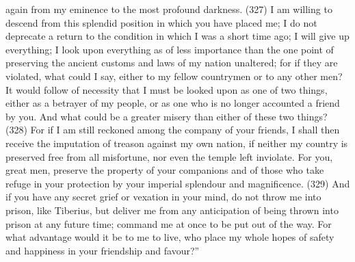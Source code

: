 again from my eminence to the most profound darkness. (327) I am willing to descend from this
splendid position in which you have placed me; I do not deprecate a return to the condition in which
I was a short time ago; I will give up everything; I look upon everything as of less importance than
the one point of preserving the ancient customs and laws of my nation unaltered; for if they are
violated, what could I say, either to my fellow countrymen or to any other men? It would follow of
necessity that I must be looked upon as one of two things, either as a betrayer of my people, or as
one who is no longer accounted a friend by you. And what could be a greater misery than either of
these two things? (328) For if I am still reckoned among the company of your friends, I shall then
receive the imputation of treason against my own nation, if neither my country is preserved free
from all misfortune, nor even the temple left inviolate. For you, great men, preserve the property of
your companions and of those who take refuge in your protection by your imperial splendour and
magnificence. (329) And if you have any secret grief or vexation in your mind, do not throw me into
prison, like Tiberius, but deliver me from any anticipation of being thrown into prison at any future
time; command me at once to be put out of the way. For what advantage would it be to me to live,
who place my whole hopes of safety and happiness in your friendship and favour?''

